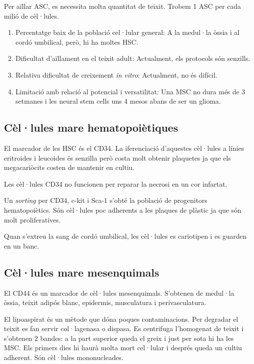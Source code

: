 Per aïllar ASC, es necessita molta quantitat de teixit. Trobem 1 ASC per cada milió de cèl·lules.

\begin{enumerate}
\item Percentatge baix de la població cel·lular general: A la medul·la òssia i al cordó umbilical, però, hi ha moltes HSC.
\item Dificultat d'aïllament en el teixit adult: Actualment, els protocols són senzills.
\item Relativa dificultat de creixement \textit{in vitro}: Actualment, no és difícil.
\item Limitació amb relació al potencial i versatilitat: Una MSC no dura més de 3 setmanes i les neural stem cells uns 4 mesos abans de ser un glioma.
\end{enumerate}

\subsection{Cèl·lules mare hematopoiètiques}
El marcador de les HSC és el CD34. La iferenciació d'aquestes
cèl·lules a línies eritroides i leucoides és senzilla però costa molt
obtenir plaquetes ja que els megacariòcits costen de mantenir en cultiu.

Les cèl·lules CD34 no funcionen per reparar la necrosi en un cor
infartat.

Un \textit{sorting} per CD34, c-kit i Sca-1 s'obté la població de
progenitors hematopoiètics. Són cèl·lules poc adherents a les plaques
de plàstic ja que són molt proliferatives.

Quan s'extreu la sang de cordó umbilical, les cèl·lules es cariotipen
i es guarden en un banc.

\subsection{Cèl·lules mare mesenquimals}
El CD44 és un marcador de cèl·lules mesenquimals. S'obtenen de
medul·la òssia, teixit adipós blanc, epidermis, musculatura i
perivasculatura.

El lipoaspirat és un mètode que dóna poques contaminacions. Per
degradar el teixit es fan servir col·lagenasa o dispasa. Es
centrifuga l'homogenat de teixit i s'obtenen 2 bandes: a la part
superior queda el greix i just per sota hi ha les MSC. Els primers
dies hi haurà molta mort cel·lular i després queda un cultiu
adherent. Són cèl·lules mononucleades.

